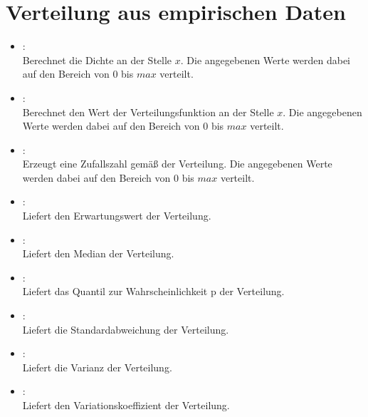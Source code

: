 \section{Verteilung aus empirischen Daten}

\begin{itemize}

\item
{}:\\
Berechnet die Dichte an der Stelle $x$.
Die angegebenen Werte werden dabei auf den Bereich von 0 bis $max$ verteilt.

\item
{}:\\
Berechnet den Wert der Verteilungsfunktion an der Stelle $x$.
Die angegebenen Werte werden dabei auf den Bereich von 0 bis $max$ verteilt.

\item
{}:\\
Erzeugt eine Zufallszahl gemäß der Verteilung.
Die angegebenen Werte werden dabei auf den Bereich von 0 bis $max$ verteilt.

\item
{}:\\
Liefert den Erwartungswert der Verteilung.

\item
{}:\\
Liefert den Median der Verteilung.

\item
{}:\\
Liefert das Quantil zur Wahrscheinlichkeit p der Verteilung.

\item
{}:\\
Liefert die Standardabweichung der Verteilung.

\item
{}:\\
Liefert die Varianz der Verteilung.

\item
{}:\\
Liefert den Variationskoeffizient der Verteilung.

\end{itemize}




